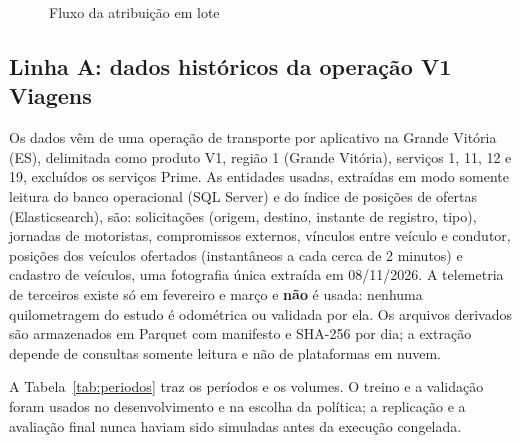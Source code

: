 \begin{figure}[!htb]
\caption{Fluxo da atribuição em lote}\label{fig:fluxo}
\centering
{}
\par{}
\end{figure}

\subsection{Linha A: dados históricos da operação V1 Viagens}

Os dados vêm de uma operação de transporte por aplicativo na Grande Vitória (ES), delimitada como produto V1, região 1 (Grande Vitória), serviços 1, 11, 12 e 19, excluídos os serviços Prime. As entidades usadas, extraídas em modo somente leitura do banco operacional (SQL Server) e do índice de posições de ofertas (Elasticsearch), são: solicitações (origem, destino, instante de registro, tipo), jornadas de motoristas, compromissos externos, vínculos entre veículo e condutor, posições dos veículos ofertados (instantâneos a cada cerca de 2 minutos) e cadastro de veículos, uma fotografia única extraída em 08/11/2026. A telemetria de terceiros existe só em fevereiro e março e \textbf{não} é usada: nenhuma quilometragem do estudo é odométrica ou validada por ela. Os arquivos derivados são armazenados em Parquet com manifesto e SHA-256 por dia; a extração depende de consultas somente leitura e não de plataformas em nuvem.

A Tabela~\ref{tab:periodos} traz os períodos e os volumes. O treino e a validação foram usados no desenvolvimento e na escolha da política; a replicação e a avaliação final nunca haviam sido simuladas antes da execução congelada.

